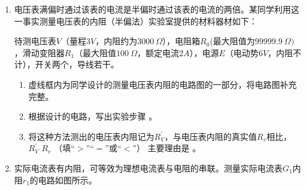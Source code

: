 \begin{enumerate}[leftmargin=0em]
\begin{enumerate}
\end{enumerate}


\newpage
\item 
{}
电压表满偏时通过该表的电流是半偏时通过该表的电流的两倍。某同学利用这一事实测量电压表的内阻（半偏法）实验室提供的材料器材如下：

待测电压表$ V $（量程$ 3V $，内阻约为$ 3000 \ \Omega $），电阻箱$ R_{0} $(最大阻值为$ 99999.9 \ \Omega ) $，滑动变阻器$ R_{1} $（最大阻值$ 100 \ \Omega $，额定电流$ 2A $），电源$ E $（电动势$ 6V $，内阻不计），开关两个，导线若干。
\begin{figure}[h!]
\centering

\end{figure}

\begin{enumerate}
\renewcommand{\labelenumi}{\arabic{enumi}.}
\item
虚线框内为同学设计的测量电压表内阻的电路图的一部分，将电路图补充完整。
\item 
根据设计的电路，写出实验步骤
。

 \hfullline 
 
 \item 
 将这种方法测出的电压表内阻记为$ R ^{\prime} _ V $，与电压表内阻的真实值$ R_v $相比，$ R ^{\prime} _ V $ \tk{$ > $} $ R_v $ （填“$ > $”“$ = $”或“$ < $”）
 主要理由是  。


\end{enumerate}







\newpage	
\item 
{}
实际电流表有内阻，可等效为理想电流表与电阻的串联。测量实际电流表$ G_{1} $内阻$ r_{1} $的电路如图所示。
\begin{figure}[h!]
\centering

\end{figure}


\end{enumerate}
